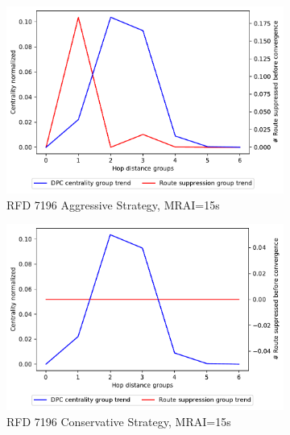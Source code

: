 \begin{figure}[H]
     \hfill
     \begin{subfigure}[b]{0.325\textwidth}
         \centering
         \includegraphics[width=\textwidth]{images/RFD/miceVSelephants/MultiMRAI/15/mice/cisco_1000_RFD_7196_aggressive_nodeConvergence_centVSsup_trend.pdf}
         \caption{RFD 7196 Aggressive Strategy, MRAI=15s}
         \label{fig:1000_7196RFDA_centVSsup_mices}
     \end{subfigure}
     \hfill
     \begin{subfigure}[b]{0.325\textwidth}
         \centering
         \includegraphics[width=\textwidth]{images/RFD/miceVSelephants/MultiMRAI/15/mice/cisco_1000_RFD_7196_conservative_nodeConvergence_centVSsup_trend.pdf}
         \caption{RFD 7196 Conservative Strategy, MRAI=15s}
         \label{fig:1000_7196RFDC_centVSsup_mices}
     \end{subfigure}
     \vfill
     \begin{subfigure}[b]{0.325\textwidth}

\end{subfigure}
\end{figure}
